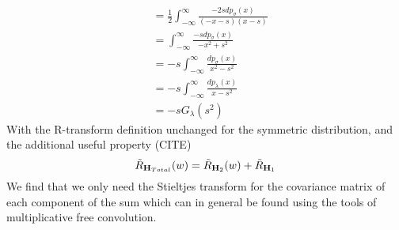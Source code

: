 \documentclass[12pt,a4paper]{report}
\begin{document}
\begin{enumerate}
\begin{align*}
	 	 \\&  =  
	 	 	 	 \frac{1}{2} \int_{-\infty}^{\infty} \frac{-2s dp_{\sigma}(x)}{(-x - s)(x - s)}
	  	 \\&  =  
	 	 	 	\int_{-\infty}^{\infty} \frac{-s dp_{\sigma}(x)}{-x^2 + s^2} 	
 	 	  	 \\&  =  
 	 	 	-s  \int_{-\infty}^{\infty}  \frac{dp_{\sigma}(x)}{ x^2 - s^2} 	 
 	 	 \\&  =  
			-s  \int_{-\infty}^{\infty}  \frac{dp_{\lambda}(x)}{ x - s^2} 
	 	 \\&  = 
	 	 	-s G_{\lambda}(s^2)
	 	 \end{align*}
With the R-transform definition unchanged for the symmetric distribution, and the additional useful property (CITE)
\begin{equation}
\tilde{R}_{\mathbf{H}_{Total}}(w) = \tilde{R}_{\mathbf{H}_{2}}(w) + \tilde{R}_{\mathbf{H}_{1}}
\end{equation}
We find that we only need the Stieltjes transform for the covariance matrix of each component of the sum which can in general be found using the tools
of multiplicative free convolution.


\end{enumerate}
\end{document}
